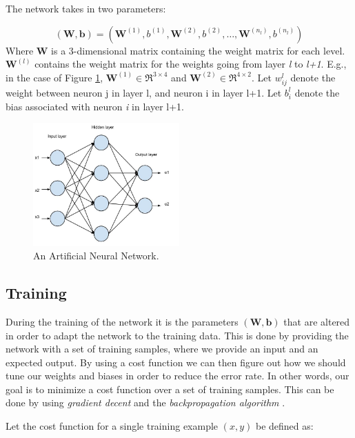 The network takes in two parameters: 

\begin{equation}
	(\mathbf{W, b}) = (\mathbf{W}^{(1)}, b^{(1)}, \mathbf{W}^{(2)}, b^{(2)}, \dots , \mathbf{W}^{(n_l)}, b^{(n_l)})	
\end{equation}
 Where \textbf{W} is a 3-dimensional matrix containing the weight matrix for each level. $ \mathbf{W}^{(l)} $ contains the weight matrix for the weights going from layer \textit{l} to \textit{l+1}. E.g., in the case of Figure \ref{fig_ann}, $ \mathbf{W}^{(1)} \in \Re ^{3 \times 4}$ and $ \mathbf{W}^{(2)} \in \Re ^{4 \times 2}$. Let $ w_{ij}^l $ denote the weight between neuron j in layer l, and neuron i in layer l+1. Let $ b_i^l $ denote the bias associated with neuron \textit{i} in layer l+1. 

\begin{figure}[h!]
  \centering
      \includegraphics[width=0.5\textwidth]{Figures/Background/ann}
  \caption{An Artificial Neural Network.}
  \label{fig_ann}
\end{figure}


\subsection{Training} \label{sec_ann_training}
During the training of the network it is the parameters $ (\mathbf{W, b}) $ that are altered in order to adapt the network to the training data. This is done by providing the network with a set of training samples, where we provide an input and an expected output. By using a cost function we can then figure out how we should tune our weights and biases in order to reduce the error rate. In other words, our goal is to minimize a cost function over a set of training samples. This can be done by using \textit{gradient decent} and the \textit{backpropagation algorithm} \cite{Rumelhart1986}\cite{Leonard1990}\cite{LeCun1998}. 

Let the cost function for a single training example $(x,y)$ be defined as:

